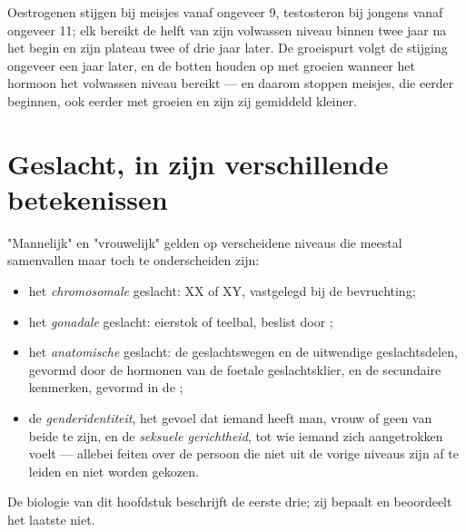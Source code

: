 \begin{example}\label{ex:g11:becoming-male-female:curves}
Oestrogenen stijgen bij meisjes vanaf ongeveer 9, testosteron bij jongens
vanaf ongeveer 11; elk bereikt de helft van zijn volwassen niveau binnen
twee jaar na het begin en zijn plateau twee of drie jaar later. De
groeispurt volgt de stijging ongeveer een jaar later, en de botten houden
op met groeien wanneer het hormoon het volwassen niveau bereikt --- en
daarom stoppen meisjes, die eerder beginnen, ook eerder met groeien en
zijn zij gemiddeld kleiner.
\end{example}

\section{Geslacht, in zijn verschillende betekenissen}

\begin{proposition}\label{prop:g11:becoming-male-female:levels}
"Mannelijk" en "vrouwelijk" gelden op verscheidene niveaus die meestal
samenvallen maar toch te onderscheiden zijn:
\begin{itemize}
  \item het \emph{chromosomale} geslacht: XX of XY, vastgelegd bij de
        bevruchting;
  \item het \emph{gonadale} geslacht: eierstok of teelbal, beslist door
        ;
  \item het \emph{anatomische} geslacht: de geslachtswegen en de
        uitwendige geslachtsdelen, gevormd door de hormonen van de
        foetale geslachtsklier, en de secundaire kenmerken, gevormd in de
        ;
  \item de \emph{genderidentiteit}, het gevoel dat iemand heeft man,
        vrouw of geen van beide te zijn, en de \emph{seksuele
        gerichtheid}, tot wie iemand zich aangetrokken voelt --- allebei
        feiten over de persoon die niet uit de vorige niveaus zijn af te
        leiden en niet worden gekozen.
\end{itemize}
De biologie van dit hoofdstuk beschrijft de eerste drie; zij bepaalt en
beoordeelt het laatste niet.
\end{proposition}
\admitted

